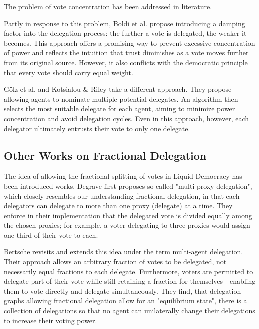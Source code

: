 The problem of vote concentration has been addressed in literature. 

Partly in response to this problem, Boldi et al. propose introducing a damping factor into the delegation process: the further a vote is delegated, the weaker it becomes. \cite{boldiViscousDemocracySocial2011} This approach offers a promising way to prevent excessive concentration of power and reflects the intuition that trust diminishes as a vote moves further from its original source. However, it also conflicts with the democratic principle that every vote should carry equal weight. 

Gölz et al. and Kotsialou \& Riley take a different approach. They propose allowing agents to nominate multiple potential delegates. An algorithm then selects the most suitable delegate for each agent, aiming to minimize power concentration and avoid delegation cycles. \cite{kotsialouIncentivisingParticipationLiquid2019, golzFluidMechanicsLiquid2021} Even in this approach, however, each delegator ultimately entrusts their vote to only one delegate.

\subsection{Other Works on Fractional Delegation}

The idea of allowing the fractional splitting of votes in Liquid Democracy has been introduced works. Degrave first proposes so-called "multi-proxy delegation", which closely resembles our understanding fractional delegation, in that each delegators can delegate to more than one proxy (delegate) at a time. \cite{degraveResolvingMultiproxyTransitive2014} 
They enforce in their implementation that the delegated vote is divided equally among the chosen proxies; for example, a voter delegating to three proxies would assign one third of their vote to each.

Bertsche revisits and extends this idea under the term multi-agent delegation.  \cite{bersetcheGeneralizingLiquidDemocracy2022} Their approach allows an arbitrary fraction of votes to be delegated, not necessarily equal fractions to each delegate. Furthermore, voters are permitted to delegate part of their vote while still retaining a fraction for themselves—enabling them to vote directly and delegate simultaneously. They find, that delegation graphs allowing fractional delegation allow for an "equilibrium state", there is a collection of delegations so that no agent can unilaterally change their delegations to increase their voting power.
